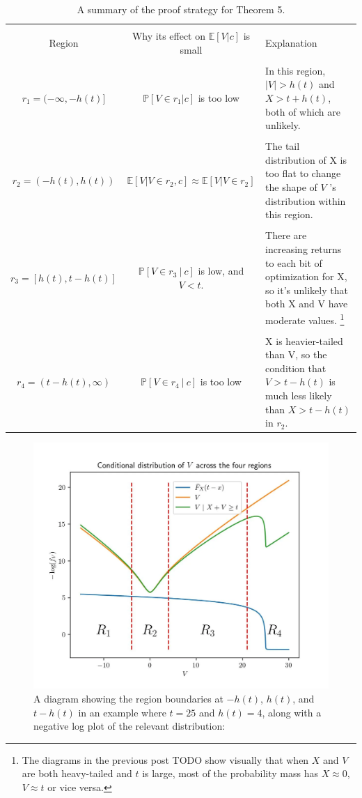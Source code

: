 \documentclass[../main.tex]{subfiles}
\begin{document}
\begin{table}
\label{table1}
    \centering
    \begin{tabular}{|c|c|p{70mm}|}
    \hline \\
         Region
        &Why its effect on \(\mathbb E[V|c]\) is small
        & Explanation
    \\ \hline \\
        \(r_1=(-\infty,-h(t)]\)
        & \(\mathbb P[V\in r_1 | c]\) is too low  & In this region, \(|V| > h(t)\) and \(X > t + h(t)\), both of which are unlikely.
    \\ \hline \\
        \(r_2=(-h(t),h(t))\) 
        &  \(\mathbb E[V|V \in r_2, c] \approx \mathbb E[V|V \in r_2]\)
        & The tail distribution of X is too flat to change the shape of \(V\) 's distribution within this region.
    \\ \hline \\
        \(r_3\!=\![h(t),t\!-\!h(t)]\)
        & \(\mathbb P\left[ V \in r_3\ |\ c\right]\) is low, and \(V<t\).
        & There are increasing returns to each bit of optimization for X, so it's unlikely that both X and V have moderate values. \footnote{The diagrams in the previous post TODO show visually that when \(X\) and \(V\) are both heavy-tailed and \(t\) is large, most of the probability mass has \(X \approx 0\), \(V \approx t\) or vice versa.}
    \\ \hline \\
    \(r_4=(t-h(t),\infty)\) &  \(\mathbb P[V\in r_4 \ |\ c]\) is too low
        & X is heavier-tailed than V, so the condition that \(V > t-h(t)\) is much less likely than \(X > t - h(t)\) in \(r_2\).
    \\ \hline
    \end{tabular}
    \caption{A summary of the proof strategy for Theorem 5.}
\end{table}

\begin{figure}
    \centering
    \includegraphics[width=0.5\linewidth]{supplementary/theorem5_diagram.png}
    \caption{A diagram showing the region boundaries at \(-h(t)\), \(h(t)\), and \(t-h(t)\) in an example where \(t=25\) and \(h(t)=4\), along with a negative log plot of the relevant distribution:}
    \label{fig:theorem5-diagram}
\end{figure}
\end{document}
